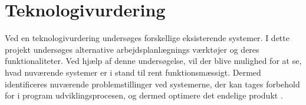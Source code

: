 \section{Teknologivurdering}
Ved en teknologivurdering undersøges forskellige eksisterende systemer. I dette projekt undersøges alternative arbejdsplanlægnings værktøjer og deres funktionaliteter. Ved hjælp af denne undersøgelse, vil der blive mulighed for at se, hvad nuværende systemer er i stand til rent funktionsmæssigt. Dermed identificeres nuværende problemstillinger ved systemerne, der kan tages forbehold for i program udviklingsprocesen, og dermed optimere det endelige produkt \citep{PeterLarsen}.



